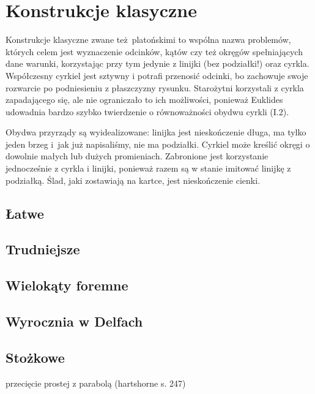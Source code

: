 %

\chapter{Konstrukcje klasyczne}
Konstrukcje klasyczne zwane też platońskimi to wspólna nazwa problemów, których celem jest wyznaczenie odcinków, kątów czy też okręgów spełniających dane warunki, korzystając przy tym jedynie z linijki (bez podziałki!) oraz cyrkla.
Współczesny cyrkiel jest sztywny i potrafi przenosić odcinki, bo zachowuje swoje rozwarcie po podniesieniu z płaszczyzny rysunku.
Starożytni korzystali z cyrkla zapadającego się, ale nie ograniczało to ich możliwości, ponieważ Euklides udowadnia bardzo szybko twierdzenie o równoważności obydwu cyrkli (I.2).

Obydwa przyrządy są wyidealizowane: linijka jest nieskończenie długa, ma tylko jeden brzeg i~jak już napisaliśmy, nie ma podziałki.
Cyrkiel może kreślić okręgi o dowolnie małych lub dużych promieniach.
Zabronione jest korzystanie jednocześnie z cyrkla i linijki, ponieważ razem są w stanie imitować linijkę z podziałką.
Ślad, jaki zostawiają na kartce, jest nieskończenie cienki.

\section{Łatwe}


\section{Trudniejsze}


\section{Wielokąty foremne}


\section{Wyrocznia w Delfach}


\section{Stożkowe}
przecięcie prostej z parabolą (hartshorne s. 247)


